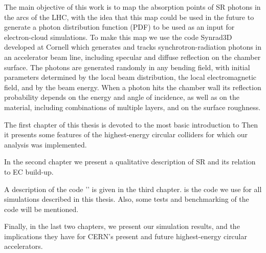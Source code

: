 The main objective of this work is to map the absorption points of SR photons
in the arcs of the LHC, with the idea that this map could be used in the future
to generate a photon distribution function (PDF) to be used as an input for
electron-cloud simulations. To make this map we use the code Synrad3D developed
at Cornell which generates and tracks synchrotron-radiation photons in an
accelerator beam line, including specular and diffuse reflection on the chamber
surface.  The photons are generated randomly in any bending field, with initial
parameters determined by the local beam distribution, the local electromagnetic
field, and by the beam energy.  When a photon hits the chamber wall its
reflection probability depends on the energy and angle of incidence, as well as
on the material, including combinations of multiple layers, and on the surface
roughness.

The first chapter of this thesis is devoted to the most basic introduction to
Then it presents some features of the highest-energy circular colliders for
which our analysis was implemented.

In the second chapter we present a qualitative description of SR and its
relation to EC build-up. 

A description of the code '\srthree{}' is given in the third chapter. \srthree
is the code we use for all simulations described in this thesis. Also, some
tests and benchmarking of the code will be mentioned.

Finally, in the last two chapters, we present our simulation results, and the
implications they have for CERN's present and future highest-energy circular accelerators. 



